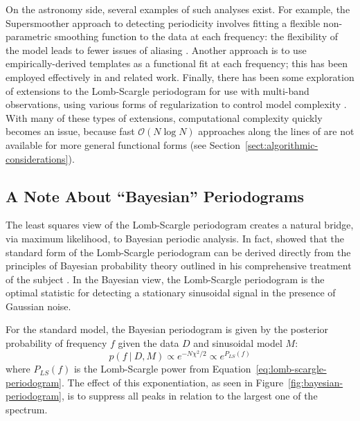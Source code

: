\documentclass[preprint]{aastex}
\newcommand{\fig}[1]{Figure~\ref{fig:#1}}
\newcommand{\Eq}[1]{Equation~\ref{eq:#1}}
\newcommand{\eq}[1]{\Eq{#1}}
\newcommand{\eqlabel}[1]{\label{eq:#1}}
\newcommand{\Sect}[1]{Section~\ref{sect:#1}}
\newcommand{\sect}[1]{\Sect{#1}}
\newcommand{\sectlabel}[1]{\label{sect:#1}}
\begin{document}
On the astronomy side, several examples of such analyses exist.
For example, the Supersmoother approach to detecting periodicity
involves fitting a flexible non-parametric smoothing
function to the data at each frequency: the flexibility of the model leads
to fewer issues of aliasing \citep{Reimann94}.
Another approach is to use empirically-derived templates as a functional fit
at each frequency; this has been employed effectively in \citet{Sesar2010,
Sesar2013} and related work.
Finally, there has been some exploration of extensions to the Lomb-Scargle
periodogram for use with multi-band observations, using various forms of
regularization to control model complexity \citep{VanderPlas2015, Long2016}.
With many of these types of extensions, computational complexity quickly
becomes an issue, because fast $\mathcal{O}(N\log N)$ approaches along the
lines of \citet{Press89} are not available for more general functional forms
(see \sect{algorithmic-considerations}).


\subsection{A Note About ``Bayesian'' Periodograms}
\sectlabel{bayesian-periodograms}
The least squares view of the Lomb-Scargle periodogram creates a natural
bridge, via maximum likelihood, to Bayesian periodic analysis.
In fact, \citet{Jaynes87} showed that the standard form of the Lomb-Scargle
periodogram can be derived directly from the principles of Bayesian probability
theory outlined in his comprehensive treatment of the subject \citep{Jaynes03}.
In the Bayesian view, the Lomb-Scargle periodogram is the optimal statistic
for detecting a stationary sinusoidal signal in the presence of Gaussian
noise.

For the standard model, the Bayesian periodogram is given by the posterior
probability of frequency $f$ given the data $D$ and sinusoidal model $M$:
\begin{equation}
  p(f~|~D, M) \propto e^{-N \chi^2 / 2} \propto e^{P_{LS}(f)}
  \eqlabel{bayesian-periodogram}
\end{equation}
where $P_{LS}(f)$ is the Lomb-Scargle power from \eq{lomb-scargle-periodogram}.
The effect of this exponentiation, as seen in \fig{bayesian-periodogram},
is to suppress all peaks in relation to the largest one of the spectrum.
\end{document}
